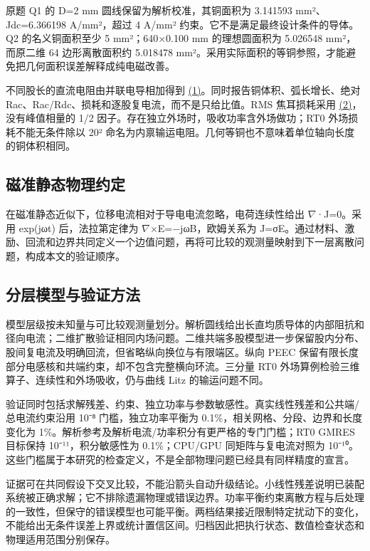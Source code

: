 \documentclass[journal,10pt]{IEEEtran}
\begin{document}
原题 Q1 的 D=2 mm 圆线保留为解析校准，其铜面积为 3.141593 mm²、Jdc=6.366198 A/mm²，超过 4 A/mm² 约束。它不是满足最终设计条件的导体。Q2 的名义铜面积至少 5 mm²；640×0.100 mm 的理想圆面积为 5.026548 mm²，而原二维 64 边形离散面积约 5.018478 mm²。采用实际面积的等铜参照，才能避免把几何面积误差解释成纯电磁改善。


不同股长的直流电阻由并联电导相加得到 \href{report_zh-CN_ieee.pdf#E01}{(1)}。同时报告铜体积、弧长增长、绝对 Rac、Rac/Rdc、损耗和逐股复电流，而不是只给比值。RMS 焦耳损耗采用 \href{report_zh-CN_ieee.pdf#E02}{(2)}，没有峰值相量的 1/2 因子。存在独立外场时，吸收功率含外场做功；RT0 外场损耗不能无条件除以 20² 命名为内禀输运电阻。几何等铜也不意味着单位轴向长度的铜体积相同。


\subsection*{磁准静态物理约定}
\hypertarget{02.maxwell.heading}{}
在磁准静态近似下，位移电流相对于导电电流忽略，电荷连续性给出 \(\nabla\)·J=0。采用 exp(jωt) 后，法拉第定律为 \(\nabla\)×E=−jωB，欧姆关系为 J=σE。通过材料、激励、回流和边界共同定义一个边值问题，再将可比较的观测量映射到下一层离散问题，构成本文的验证顺序。


\subsection*{分层模型与验证方法}
\hypertarget{02.hierarchy.heading}{}
模型层级按未知量与可比较观测量划分。解析圆线给出长直均质导体的内部阻抗和径向电流；二维扩散验证相同内场问题。二维共端多股模型进一步保留股内分布、股间复电流及明确回流，但省略纵向换位与有限端区。纵向 PEEC 保留有限长度部分电感核和共端约束，却不包含完整横向环流。三分量 RT0 外场算例检验三维算子、连续性和外场吸收，仍与曲线 Litz 的输运问题不同。


验证同时包括求解残差、约束、独立功率与参数敏感性。真实线性残差和公共端/总电流约束沿用 10⁻⁸ 门槛，独立功率平衡为 0.1\%，相关网格、分段、边界和长度变化为 1\%。解析参考及解析电流/功率积分有更严格的专门门槛；RT0 GMRES 目标保持 10⁻¹¹，积分敏感性为 0.1\%；CPU/GPU 同矩阵与复电流对照为 10⁻¹⁰。这些门槛属于本研究的检查定义，不是全部物理问题已经具有同样精度的宣言。


证据可在共同假设下交叉比较，不能沿箭头自动升级结论。小线性残差说明已装配系统被正确求解；它不排除遗漏物理或错误边界。功率平衡约束离散方程与后处理的一致性，但保守的错误模型也可能平衡。两档结果接近限制特定扰动下的变化，不能给出无条件误差上界或统计置信区间。归档因此把执行状态、数值检查状态和物理适用范围分别保存。
\end{document}
